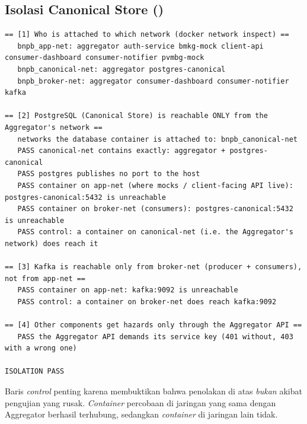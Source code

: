 \subsection*{Isolasi Canonical Store ()}
\begin{lstlisting}
== [1] Who is attached to which network (docker network inspect) ==
   bnpb_app-net: aggregator auth-service bmkg-mock client-api consumer-dashboard consumer-notifier pvmbg-mock
   bnpb_canonical-net: aggregator postgres-canonical
   bnpb_broker-net: aggregator consumer-dashboard consumer-notifier kafka

== [2] PostgreSQL (Canonical Store) is reachable ONLY from the Aggregator's network ==
   networks the database container is attached to: bnpb_canonical-net
   PASS canonical-net contains exactly: aggregator + postgres-canonical
   PASS postgres publishes no port to the host
   PASS container on app-net (where mocks / client-facing API live): postgres-canonical:5432 is unreachable
   PASS container on broker-net (consumers): postgres-canonical:5432 is unreachable
   PASS control: a container on canonical-net (i.e. the Aggregator's network) does reach it

== [3] Kafka is reachable only from broker-net (producer + consumers), not from app-net ==
   PASS container on app-net: kafka:9092 is unreachable
   PASS control: a container on broker-net does reach kafka:9092

== [4] Other components get hazards only through the Aggregator API ==
   PASS the Aggregator API demands its service key (401 without, 403 with a wrong one)

ISOLATION PASS
\end{lstlisting}

Baris \emph{control} penting karena membuktikan bahwa penolakan di atas \emph{bukan} akibat pengujian yang rusak.
\emph{Container} percobaan di jaringan yang sama dengan Aggregator berhasil terhubung, sedangkan \emph{container} di jaringan lain
tidak.

